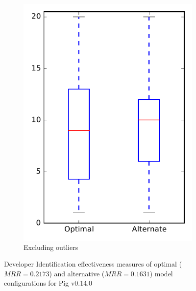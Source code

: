 \begin{figure}
\begin{subfigure}{.4\textwidth}
        \includegraphics[height=0.4\textheight]{figures/combo/dit_rq1_pig_no_outlier}
        \caption{Excluding outliers}\label{fig:combo:dit:rq1:pig_no_outlier}
    \end{subfigure}
\caption{Developer Identification effectiveness measures of optimal ($MRR=0.2173$) and alternative ($MRR=0.1631$) model configurations for Pig v0.14.0}
\label{fig:combo:dit:rq1:pig}
\end{figure}
